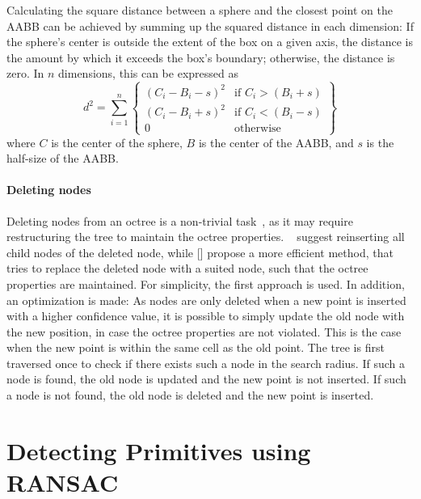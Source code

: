 Calculating the square distance between a sphere and the closest point on the AABB can be achieved by summing up the
squared distance in each dimension:
If the sphere's center is outside the extent of the box on a given axis,
the distance is the amount by which it exceeds the box's boundary; otherwise, the distance is zero.
In $n$ dimensions, this can be expressed as
\begin{equation}
    d^2 = \sum_{i=1}^{n} \left\{
    \begin{array}{ll}
    (C_i - B_i - s)
        ^2                & \text{if } C_i > (B_i + s) \\
        (C_i - B_i + s)^2 & \text{if } C_i < (B_i - s) \\
        0                 & \text{otherwise}
    \end{array}
    \right\}
\end{equation}
where $C$ is the center of the sphere, $B$ is the center of the AABB, and $s$ is the half-size of the AABB\@.
\parencite{glassner_graphics_1994}

\paragraph{Deleting nodes}
Deleting nodes from an octree is a non-trivial task~\parencite{samet_design_1989, finkel_quad_1974}, as it may require restructuring the tree to maintain the octree properties.
\citeauthor{finkel_quad_1974}~\parencite{finkel_quad_1974} suggest reinserting all child nodes of the deleted node,
while [] propose a more efficient method, that tries to replace the deleted node with a suited node, such that the octree properties are maintained.
For simplicity, the first approach is used.
In addition, an optimization is made:
As nodes are only deleted when a new point is inserted with a higher confidence value,
it is possible to simply update the old node with the new position, in case the octree properties are not violated.
This is the case when the new point is within the same cell as the old point.
The tree is first traversed once to check if there exists such a node in the search radius.
If such a node is found, the old node is updated and the new point is not inserted.
If such a node is not found, the old node is deleted and the new point is inserted.


\section{Detecting Primitives using RANSAC}

